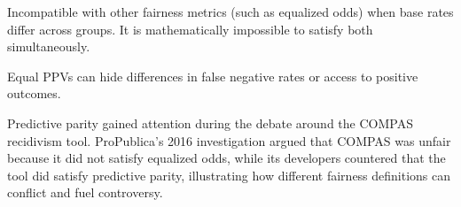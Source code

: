 {
\item Incompatible with other fairness metrics (such as equalized odds) when base rates differ across groups. It is mathematically
impossible to satisfy both simultaneously.
\item Equal PPVs can hide differences in false negative rates or access to positive outcomes.
}

\clearpage

\thispagestyle{customstyle}

{Predictive parity gained attention during the debate around the COMPAS recidivism tool. ProPublica’s 2016 investigation argued that COMPAS was
unfair because it did not satisfy equalized odds, while its developers countered that the tool did satisfy predictive parity, illustrating how
different fairness definitions can conflict and fuel controversy.}